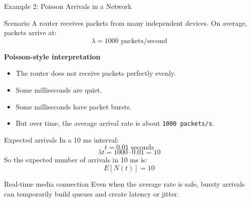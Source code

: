 \documentclass[aspectratio=169]{beamer}
\begin{document}
\begin{frame}{Example 2: Poisson Arrivals in a Network}
\tiny

\begin{block}{Scenario}
A router receives packets from many independent devices. On average, packets arrive at:
\[
\lambda = 1000 \text{ packets/second}
\]
\end{block}

\vspace{0.15cm}

\textbf{Poisson-style interpretation}

\begin{itemize}
    \item The router does not receive packets perfectly evenly.
    \item Some milliseconds are quiet.
    \item Some milliseconds have packet bursts.
    \item But over time, the average arrival rate is about \texttt{1000 packets/s}.
\end{itemize}

\vspace{0.15cm}

\begin{exampleblock}{Expected arrivals}
In a 10 ms interval:
\[
t = 0.01 \text{ seconds}
\]
\[
\lambda t = 1000 \cdot 0.01 = 10
\]
So the expected number of arrivals in 10 ms is:
\[
E[N(t)] = 10
\]
\end{exampleblock}

\vspace{0.15cm}

\begin{alertblock}{Real-time media connection}
Even when the average rate is safe, bursty arrivals can temporarily build queues and create latency or jitter.
\end{alertblock}

\end{frame}
\end{document}
